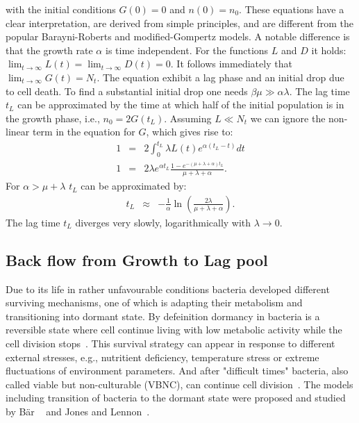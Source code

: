 \documentclass[10pt,A4paper]{article}
\begin{document}
with the initial conditions $G(0)=0$ and $n(0)=n_0$. 
These equations have a clear interpretation, are derived from simple principles, and are different from the popular Barayni-Roberts and modified-Gompertz models. 
A notable difference is that the growth rate $\alpha$ is time independent. 
For the functions $L$ and $D$ it holds: $\lim_{t\to\infty} L(t) = \lim_{t\to\infty} D(t) = 0$. 
It follows immediately that $\lim_{t\to\infty} G(t) = N_t$. 
The equation exhibit a lag phase and an initial drop due to cell death. 
To find a substantial initial drop one needs $\beta \mu \gg \alpha \lambda$. 
The lag time $t_L$ can be approximated by the time at which half of the initial population is in the growth phase, i.e., $n_0=2G(t_L)$. 
Assuming $L\ll N_t$ we can ignore the non-linear term in the equation for $G$, which gives rise to:
\begin{eqnarray}
1&=& 2\int_0^{t_L} \lambda L(t)e^{\alpha(t_L-t)}dt\\
1  &=& 2\lambda e^{\alpha t_L}\frac{1-e^{-(\mu+\lambda+\alpha)t_L}}{\mu+\lambda+\alpha}.
\end{eqnarray}
For $\alpha > \mu+\lambda$ $t_L$ can be approximated by:
\begin{eqnarray}
t_L &\approx& -\frac{1}{\alpha}\ln\left(\frac{2\lambda}{\mu+\lambda+\alpha}\right).
\end{eqnarray}
The lag time $t_L$ diverges very slowly, logarithmically with $\lambda\to 0$.

\subsection{Back flow from Growth to Lag pool}

Due to its life in rather unfavourable conditions bacteria developed different surviving mechanisms, one of which is adapting their metabolism and transitioning into dormant state.
By defeinition dormancy in bacteria is a reversible state where cell continue living with low metabolic activity while the cell division stops~\cite{kaprelyants_dormancy_1993}. 
This survival strategy can appear in response to different external stresses, e.g., nutritient deficiency, temperature stress or extreme fluctuations of environment parameters.
And after "difficult times" bacteria, also called viable but non-culturable (VBNC), can continue cell division~\cite{kell_viability_1998}.
The models including transition of bacteria to the dormant state were proposed and studied by Bär \etal~\cite{bar_modelling_2002} and Jones and Lennon~\cite{jones_dormancy_2010}.
\end{document}
